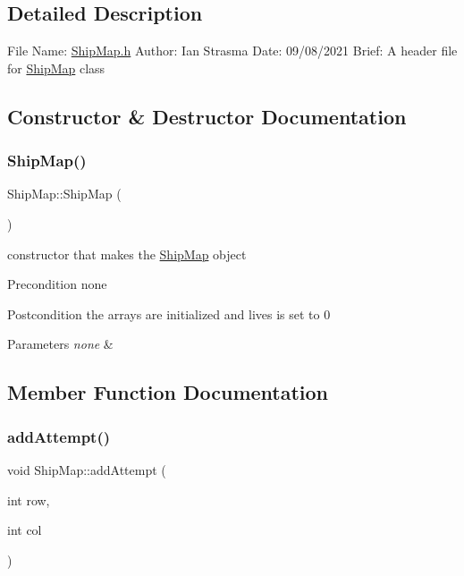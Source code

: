 \subsection{Detailed Description}
File Name\+: \hyperlink{ShipMap_8h_source}{Ship\+Map.\+h} Author\+: Ian Strasma Date\+: 09/08/2021 Brief\+: A header file for \hyperlink{classShipMap}{Ship\+Map} class 

\subsection{Constructor \& Destructor Documentation}
\mbox{\label{classShipMap_af52a69332839e08c8f4c6e24758f32da}} 
\subsubsection{\texorpdfstring{Ship\+Map()}{ShipMap()}}
{\footnotesize\ttfamily Ship\+Map\+::\+Ship\+Map (\begin{DoxyParamCaption}{ }\end{DoxyParamCaption})}

constructor that makes the \hyperlink{classShipMap}{Ship\+Map} object

\begin{DoxyPrecond}{Precondition}
none 
\end{DoxyPrecond}
\begin{DoxyPostcond}{Postcondition}
the arrays are initialized and lives is set to 0 
\end{DoxyPostcond}

\begin{DoxyParams}{Parameters}
{\em none} & \\
\hline
\end{DoxyParams}


\subsection{Member Function Documentation}
\mbox{\label{classShipMap_a216754cfcb75424c6dfd8fcb3f0976c3}} 
\subsubsection{\texorpdfstring{add\+Attempt()}{addAttempt()}}
{\footnotesize\ttfamily void Ship\+Map\+::add\+Attempt (\begin{DoxyParamCaption}\item[{int}]{row,  }\item[{int}]{col }\end{DoxyParamCaption})}

